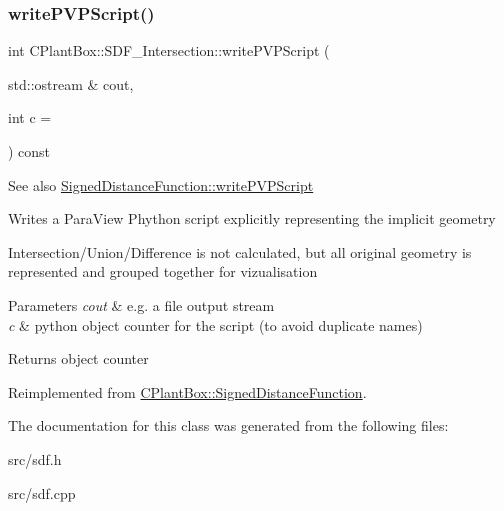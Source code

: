 \subsubsection{\texorpdfstring{write\+P\+V\+P\+Script()}{writePVPScript()}}
{\footnotesize\ttfamily int C\+Plant\+Box\+::\+S\+D\+F\+\_\+\+Intersection\+::write\+P\+V\+P\+Script (\begin{DoxyParamCaption}\item[{std\+::ostream \&}]{cout,  }\item[{int}]{c = {} }\end{DoxyParamCaption}) const\hspace{0.3cm}{\ttfamily [virtual]}}

\begin{DoxySeeAlso}{See also}
\hyperlink{classCPlantBox_1_1SignedDistanceFunction_a0098fb469c9be5557d5593cec9e76d2a}{Signed\+Distance\+Function\+::write\+P\+V\+P\+Script}
\end{DoxySeeAlso}
Writes a Para\+View Phython script explicitly representing the implicit geometry

Intersection/\+Union/\+Difference is not calculated, but all original geometry is represented and grouped together for vizualisation


\begin{DoxyParams}{Parameters}
{\em cout} & e.\+g. a file output stream \\
\hline
{\em c} & python object counter for the script (to avoid duplicate names) \\
\hline
\end{DoxyParams}
\begin{DoxyReturn}{Returns}
object counter 
\end{DoxyReturn}


Reimplemented from \hyperlink{classCPlantBox_1_1SignedDistanceFunction_a0098fb469c9be5557d5593cec9e76d2a}{C\+Plant\+Box\+::\+Signed\+Distance\+Function}.



The documentation for this class was generated from the following files\+:\begin{DoxyCompactItemize}
\item 
src/sdf.\+h\item 
src/sdf.\+cpp\end{DoxyCompactItemize}
